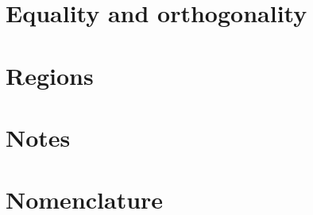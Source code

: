 \documentclass[preprint,12pt]{elsarticle}
\begin{document}
% 

% 

% 

% 

\section{Equality and orthogonality} \label{sec:Eq_Orth}


\section{Regions} \label{sec:Regions}


\section{Notes} \label{sec:Notes}


\clearpage
\section{Nomenclature} \label{sec:Nomenclature}



 

\end{document}
